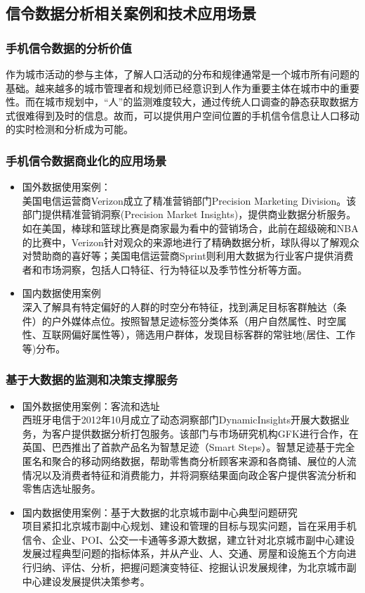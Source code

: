 \subsection{信令数据分析相关案例和技术应用场景}
\subsubsection*{手机信令数据的分析价值}
作为城市活动的参与主体，了解人口活动的分布和规律通常是一个城市所有问题的基础。越来越多的城市管理者和规划师已经意识到人作为重要主体在城市中的重要性。而在城市规划中，“人”的监测难度较大，通过传统人口调查的静态获取数据方式很难得到及时的信息。故而，可以提供用户空间位置的手机信令信息让人口移动的实时检测和分析成为可能。
\subsubsection*{手机信令数据商业化的应用场景}
\begin{itemize}
	\item 国外数据使用案例：\\
	美国电信运营商Verizon成立了精准营销部门Precision Marketing Division。该部门提供精准营销洞察(Precision Market Insights)，提供商业数据分析服务。如在美国，棒球和篮球比赛是商家最为看中的营销场合，此前在超级碗和NBA的比赛中，Verizon针对观众的来源地进行了精确数据分析，球队得以了解观众对赞助商的喜好等；美国电信运营商Sprint则利用大数据为行业客户提供消费者和市场洞察，包括人口特征、行为特征以及季节性分析等方面。
	\item 国内数据使用案例 \\
	深入了解具有特定偏好的人群的时空分布特征，找到满足目标客群触达（条件）的户外媒体点位。按照智慧足迹标签分类体系（用户自然属性、时空属性、互联网偏好属性等），筛选用户群体，发现目标客群的常驻地(居住、工作等)分布。
\end{itemize}
\subsubsection*{基于大数据的监测和决策支撑服务}
\begin{itemize}
	\item  国外数据使用案例：客流和选址\\
	西班牙电信于2012年10月成立了动态洞察部门DynamicInsights开展大数据业务，为客户提供数据分析打包服务。该部门与市场研究机构GFK进行合作，在英国、巴西推出了首款产品名为智慧足迹（Smart Steps）。智慧足迹基于完全匿名和聚合的移动网络数据，帮助零售商分析顾客来源和各商铺、展位的人流情况以及消费者特征和消费能力，并将洞察结果面向政企客户提供客流分析和零售店选址服务。
	\item 国内数据使用案例：基于大数据的北京城市副中心典型问题研究\\
	项目紧扣北京城市副中心规划、建设和管理的目标与现实问题，旨在采用手机信令、企业、POI、公交一卡通等多源大数据，建立针对北京城市副中心建设发展过程典型问题的指标体系，并从产业、人、交通、房屋和设施五个方向进行归纳、评估、分析，把握问题演变特征、挖掘认识发展规律，为北京城市副中心建设发展提供决策参考。
\end{itemize}
